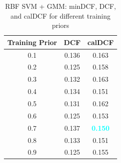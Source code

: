 \documentclass[12pt]{report}
\begin{document}
\begin{table}[H]
    \centering
    \begin{tabular}{|c|c|c|}
        \hline
        \rowcolor{blue!10}
        \textbf{Training Prior} & \textbf{DCF} & \textbf{calDCF}                  \\
        \hline
        0.1                     & 0.136        & 0.163                            \\
        \hline
        0.2                     & 0.125        & 0.158                            \\
        \hline
        0.3                     & 0.132        & 0.163                            \\
        \hline
        0.4                     & 0.134        & 0.151                            \\
        \hline
        0.5                     & 0.131        & 0.162                            \\
        \hline
        0.6                     & 0.125        & 0.153                            \\
        \hline
        0.7                     & 0.137        & \textcolor{cyan}{\textbf{0.150}} \\
        \hline
        0.8                     & 0.133        & 0.151                            \\
        \hline
        0.9                     & 0.125        & 0.155                            \\
        \hline
    \end{tabular}
    \caption{RBF SVM + GMM: minDCF, DCF, and calDCF for different training priors}
    \label{tab:RBF_SVM_GMM_Priors}
\end{table}
\end{document}
